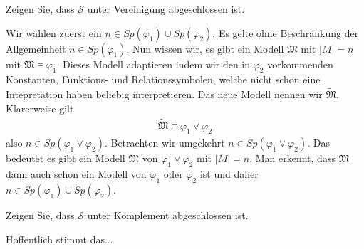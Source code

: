 \begin{exercise}[73]

\phantom{}
	Zeigen Sie, dass $\mathscr{S}$ unter Vereinigung abgeschlossen ist.

\end{exercise}


\begin{solution}

\phantom{}
	Wir wählen zuerst ein $n \in Sp(\varphi_1) \cup Sp(\varphi_2)$. Es gelte ohne Beschränkung der Allgemeinheit $n \in Sp(\varphi_1)$. Nun wissen wir, es gibt ein Modell $\mathfrak{M}$ mit $|M| = n$ mit $\mathfrak{M} \vDash \varphi_1$. Dieses Modell adaptieren indem wir den in $\varphi_2$ vorkommenden Konstanten, Funktions- und Relationssymbolen, welche nicht schon eine Intepretation haben beliebig interpretieren. Das neue Modell nennen wir $\tilde{\mathfrak{M}}$. Klarerweise gilt 
	\begin{align*}
		\tilde{\mathfrak{M}} \vDash \varphi_1 \lor \varphi_2
	\end{align*}
	also $n \in Sp(\varphi_1 \lor \varphi_2)$. \newline
	Betrachten wir umgekehrt $n \in Sp(\varphi_1 \lor \varphi_2)$. Das bedeutet es gibt ein Modell $\mathfrak{M}$ von $\varphi_1 \lor \varphi_2$ mit $|M| = n$. Man erkennt, dass $\mathfrak{M}$ dann auch schon ein Modell von $\varphi_1$ oder $\varphi_2$ ist und daher $n \in Sp(\varphi_1) \cup Sp(\varphi_2)$.
\end{solution}

\begin{exercise}[74]

\phantom{}
	Zeigen Sie, dass $\mathscr{S}$ unter Komplement abgeschlossen ist.

\end{exercise}


\begin{solution}

\phantom{}
	Hoffentlich stimmt das...

\end{solution}
